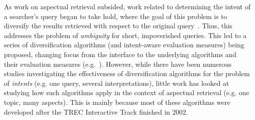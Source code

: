 


As work on aspectual retrieval subsided, work related to determining the intent of a searcher's query began to take hold, where the goal of this problem is to diversify the results retrieved with respect to the original query~\cite{rose2004understanding_user_goals}. Thus, this addresses the problem of \emph{ambiguity} for short, impoverished queries. This led to a series of diversification algorithms (and intent-aware evaluation measures) being proposed, changing focus from the interface to the underlying algorithms and their evaluation measures (e.g.~\cite{santos2010query_reformulations_diversification,santos2011intent,carbonell1998mmr,zuccon2009qprp,agrawal2009diversification,radlinski2006diversification,he2011diversification_clustering,carterette2009probabalistic,chen2006lessismore,zhai2015subtopics}). However, while there have been numerous studies investigating the effectiveness of diversification algorithms for the problem of \emph{intents} (e.g. one query, several interpretations), little work has looked at studying how such algorithms apply in the context of aspectual retrieval (e.g. one topic, many aspects). This is mainly because most of these algorithms were developed after the TREC Interactive Track finished in 2002.

